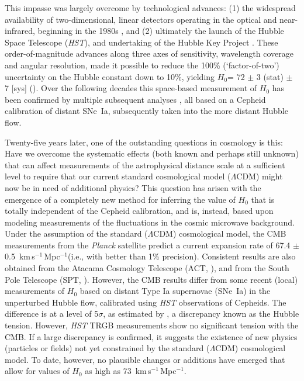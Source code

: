 \documentclass[12pt,modern]{aastex631}
\newcommand{\ho}{$H_{0}$\xspace}
\newcommand{\hounits}{\,km\,s$^{-1}$\,Mpc$^{-1}$\xspace}
\newcommand{\hst}{\emph{HST}\xspace}
\newcommand{\planck}{\emph{Planck}\xspace}
\newcommand{\sne}{SNe~Ia\xspace}
\begin{document}
This impasse was largely overcome by technological advances:
(1) the widespread availability of  two-dimensional, linear detectors operating in the optical and near-infrared, beginning in the 1980s \citep[e.g.][]{mcgonegal_1982, freedman_grieve_madore_1985, freedman_wilson_madore_1991}, and (2) ultimately the launch of the Hubble Space Telescope (\hst), and undertaking of the  Hubble Key Project \citep{freedman_2001}. These order-of-magnitude advances along three axes of sensitivity, wavelength coverage and angular resolution, made it possible to reduce the 100\% (`factor-of-two') uncertainty on the Hubble constant down to 10\%, yielding \ho = 72 $\pm$ 3 (stat) $\pm$ 7 [sys] (\citeauthor{freedman_2001}). 
Over the following decades this space-based measurement of \ho has been confirmed by multiple subsequent analyses \citep[e.g.,][]{riess_2009, freedman_2012, riess_2016, riess_2022}, all based on a Cepheid calibration of distant \sne, subsequently taken into the more distant Hubble flow.

Twenty-five years later, one of the outstanding questions in cosmology is this: Have we overcome the systematic effects (both known and perhaps still unknown) that can affect measurements of the astrophysical distance scale at a sufficient level to require that our current standard cosmological model ($\Lambda$CDM) might now be in need of additional physics? This question has arisen with the emergence of a completely new method for inferring the value of \ho that is totally independent of the Cepheid calibration, and is, instead, based upon modeling measurements of the fluctuations in the cosmic microwave background. Under the assumption of the standard ($\Lambda$CDM) cosmological model, the CMB measurements from the \planck satellite predict a current expansion rate of 67.4 $\pm$ 0.5 \hounits (i.e., with better than 1\% precision)\citep{planck_2018}. Consistent results are also obtained from the Atacama Cosmology Telescope (ACT, \cite[e.g.,][]{ACT_2024}), and from the South Pole Telescope (SPT, \cite[e.g.,][]{Balkenhol_2023, ge_2024}).  
However, the CMB results differ from some recent (local) measurements of \ho based on distant Type Ia supernovae (\sne) in the unperturbed Hubble flow, calibrated using \hst observations of Cepheids. The difference is at a level of 5$\sigma$, as estimated by \cite[][hereafter R22]{riess_2022}, a discrepancy known as the Hubble tension. However,  \hst TRGB measurements \citep{freedman_2019} show no significant tension with the CMB. If a large discrepancy is confirmed, it suggests the existence of new physics (particles or fields) not yet constrained by the  standard ($\Lambda$CDM) cosmological model. To date, however, no plausible changes or additions have emerged that allow for values of \ho  as high as 73 \hounits  \citep[see][]{divalentino_2021c}.   
\end{document}
